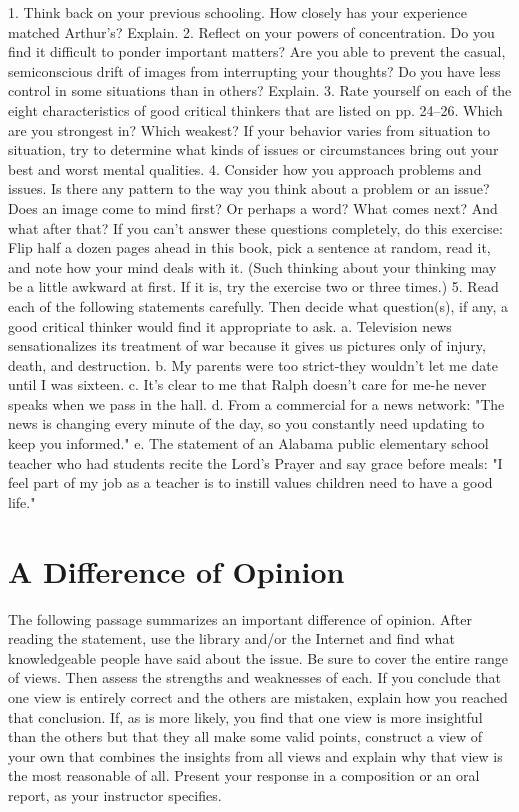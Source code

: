 \documentclass{book}
\begin{document}
1. Think back on your previous schooling. How closely has your experience matched Arthur’s? Explain.
2. Reflect on your powers of concentration. Do you find it difficult to ponder important matters? Are you able to prevent the casual, semiconscious drift of images from interrupting your thoughts? Do you have less control in some situations than in others? Explain.
3. Rate yourself on each of the eight characteristics of good critical thinkers that are listed on pp. 24–26. Which are you strongest in? Which weakest? If your behavior varies from situation to situation, try to determine what kinds of issues or circumstances bring out your best and worst mental qualities.
4. Consider how you approach problems and issues. Is there any pattern to the way you think about a problem or an issue? Does an image come to mind first? Or perhaps a word? What comes next? And what after that? If you can’t answer these questions completely, do this exercise: Flip half a dozen pages ahead in this book, pick a sentence at random, read it, and note how your mind deals with it. (Such thinking about your thinking may be a little awkward at first. If it is, try the exercise two or three times.)
5. Read each of the following statements carefully. Then decide what question(s), if any, a good critical thinker would find it appropriate to ask.
a. Television news sensationalizes its treatment of war because it gives us pictures only of injury, death, and destruction.
b. My parents were too strict-they wouldn’t let me date until I was sixteen.
c. It’s clear to me that Ralph doesn’t care for me-he never speaks when we pass in the hall.
d. From a commercial for a news network: "The news is changing every minute of the day, so you constantly need updating to keep you informed."
e. The statement of an Alabama public elementary school teacher who had students recite the Lord’s Prayer and say grace before meals: "I feel part of my job as a teacher is to instill values children need to have a good life."

\section{A Difference of Opinion}

The following passage summarizes an important difference of opinion. After reading the statement, use the library and/or the Internet and find what knowledgeable people have said about the issue. Be sure to cover the entire range of views. Then assess the strengths and weaknesses of each. If you conclude that one view is entirely correct and the others are mistaken, explain how you reached that conclusion. If, as is more likely, you find that one view is more insightful than the others but that they all make some valid points, construct a view of your own that combines the insights from all views and explain why that view is the most reasonable of all. Present your response in a composition or an oral report, as your instructor specifies.
\end{document}
